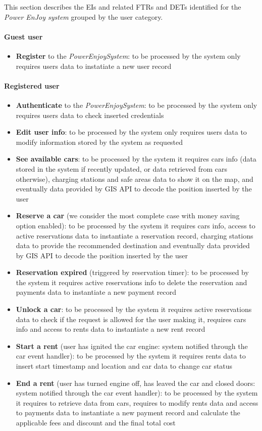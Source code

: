 This section describes the EIs and related FTRs and DETs identified for the \emph{Power EnJoy system} grouped by the user category.

\paragraph{Guest user}
\begin{itemize}
	\item \textbf{Register} to the \emph{PowerEnjoySystem}: to be processed by the system only requires users data to instatiate a new user record
\end{itemize}

\paragraph{Registered user}
\begin{itemize}
	\item \textbf{Authenticate} to the \emph{PowerEnjoySystem}: to be processed by the system only requires users data to check inserted credentials
	\item \textbf{Edit user info}: to be processed by the system only requires users data to modify information stored by the system as requested
	\item \textbf{See available cars}: to be processed by the system it requires cars info (data stored in the system if recently updated, or data retrieved from cars otherwise), charging stations and safe areas data to show it on the map, and eventually data provided by GIS API to decode the position inserted by the user
	\item \textbf{Reserve a car} (we consider the most complete case with money saving option enabled): to be processed by the system it requires cars info, access to active reservations data to instantiate a reservation record, charging stations data to provide the recommended destination and eventually data provided by GIS API to decode the position inserted by the user
	\item \textbf{Reservation expired} (triggered by reservation timer): to be processed by the system it requires active reservations info to delete the reservation and payments data to instantiate a new payment record
	\item \textbf{Unlock a car}: to be processed by the system it requires active reservations data to check if the request is allowed for the user making it, requires cars info and access to rents data to instantiate a new rent record
	\item \textbf{Start a rent} (user has ignited the car engine: system notified through the car event handler): to be processed by the system it requires rents data to insert start timestamp and location and car data to change car status
	\item \textbf{End a rent} (user has turned engine off, has leaved the car and closed doors: system notified through the car event handler): to be processed by the system it requires to retrieve data from cars, requires to modify rents data and access to payments data to instantiate a new payment record and calculate the applicable fees and discount and the final total cost
\end{itemize}


